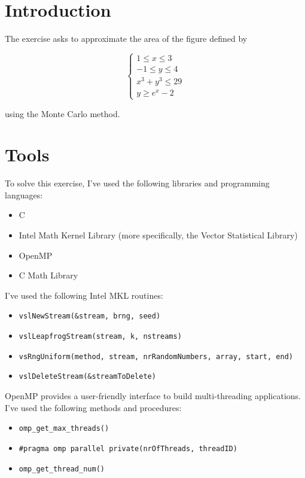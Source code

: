\documentclass{article}
\newcommand{\code}{\texttt}
\begin{document}
\section{Introduction}\label{sec:intro}
The exercise asks to approximate the area of the figure defined by

$$
\begin{cases}
1 \le x \le 3 \\
-1\le y \le 4 \\  
x^3+y^3\le 29 \\
y \ge e^x -2
\end{cases}$$

using the Monte Carlo method.

\section{Tools}
To solve this exercise, I've used the following libraries and programming languages:

\begin{itemize}
  \item C
  \item Intel Math Kernel Library (more specifically, the Vector Statistical Library)
  \item OpenMP
  \item C Math Library
\end{itemize}

I've used the following Intel MKL routines:
\begin{itemize}
  \item \code{vslNewStream(\&stream, brng, seed)}
  \item \code{vslLeapfrogStream(stream, k, nstreams)}
  \item \code{vsRngUniform(method, stream, nrRandomNumbers, array, start, end)}
  \item \code{vslDeleteStream(\&streamToDelete)}
\end{itemize}

OpenMP provides a user-friendly interface to build multi-threading applications. I've used the following methods and procedures:
\begin{itemize}
  \item \code{omp\_get\_max\_threads()}
  \item \code{\#pragma omp parallel private(nrOfThreads, threadID)}
  \item \code{omp\_get\_thread\_num()}
\end{itemize}
\end{document}

